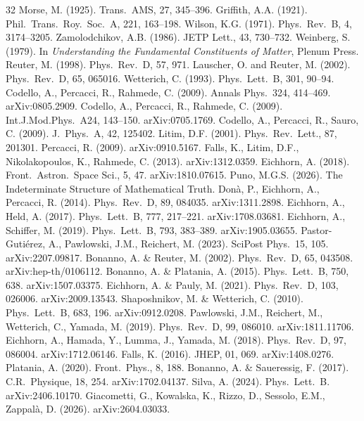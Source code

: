 \documentclass[12pt]{article}
\begin{document}
\begin{thebibliography}{32}
 Morse, M. (1925). Trans.\ AMS, 27, 345--396.
 Griffith, A.A. (1921). Phil.\ Trans.\ Roy.\ Soc.\ A, 221, 163--198.
 Wilson, K.G. (1971). Phys.\ Rev.\ B, 4, 3174--3205.
 Zamolodchikov, A.B. (1986). JETP Lett., 43, 730--732.
 Weinberg, S. (1979). In \emph{Understanding the Fundamental Constituents of Matter}, Plenum Press.
 Reuter, M. (1998). Phys.\ Rev.\ D, 57, 971.
 Lauscher, O. and Reuter, M. (2002). Phys.\ Rev.\ D, 65, 065016.
 Wetterich, C. (1993). Phys.\ Lett.\ B, 301, 90--94.
 Codello, A., Percacci, R., Rahmede, C. (2009). Annals Phys.\ 324, 414--469. arXiv:0805.2909.
 Codello, A., Percacci, R., Rahmede, C. (2009). Int.J.Mod.Phys.\ A24, 143--150. arXiv:0705.1769.
 Codello, A., Percacci, R., Sauro, C. (2009). J.\ Phys.\ A, 42, 125402.
 Litim, D.F. (2001). Phys.\ Rev.\ Lett., 87, 201301.
 Percacci, R. (2009). arXiv:0910.5167.
 Falls, K., Litim, D.F., Nikolakopoulos, K., Rahmede, C. (2013). arXiv:1312.0359.
 Eichhorn, A. (2018). Front.\ Astron.\ Space Sci., 5, 47. arXiv:1810.07615.
 Puno, M.G.S. (2026). The Indeterminate Structure of Mathematical Truth.
 Don\`{a}, P., Eichhorn, A., Percacci, R. (2014). Phys.\ Rev.\ D, 89, 084035. arXiv:1311.2898.
 Eichhorn, A., Held, A. (2017). Phys.\ Lett.\ B, 777, 217--221. arXiv:1708.03681.
 Eichhorn, A., Schiffer, M. (2019). Phys.\ Lett.\ B, 793, 383--389. arXiv:1905.03655.
 Pastor-Guti\'{e}rez, A., Pawlowski, J.M., Reichert, M. (2023). SciPost Phys.\ 15, 105. arXiv:2207.09817.
 Bonanno, A. \& Reuter, M. (2002). Phys.\ Rev.\ D, 65, 043508. arXiv:hep-th/0106112.
 Bonanno, A. \& Platania, A. (2015). Phys.\ Lett.\ B, 750, 638. arXiv:1507.03375.
 Eichhorn, A. \& Pauly, M. (2021). Phys.\ Rev.\ D, 103, 026006. arXiv:2009.13543.
 Shaposhnikov, M. \& Wetterich, C. (2010). Phys.\ Lett.\ B, 683, 196. arXiv:0912.0208.
 Pawlowski, J.M., Reichert, M., Wetterich, C., Yamada, M. (2019). Phys.\ Rev.\ D, 99, 086010. arXiv:1811.11706.
 Eichhorn, A., Hamada, Y., Lumma, J., Yamada, M. (2018). Phys.\ Rev.\ D, 97, 086004. arXiv:1712.06146.
 Falls, K. (2016). JHEP, 01, 069. arXiv:1408.0276.
 Platania, A. (2020). Front.\ Phys., 8, 188.
 Bonanno, A. \& Saueressig, F. (2017). C.R.\ Physique, 18, 254. arXiv:1702.04137.
 Silva, A. (2024). Phys.\ Lett.\ B. arXiv:2406.10170.
 Giacometti, G., Kowalska, K., Rizzo, D., Sessolo, E.M., Zappal\`{a}, D. (2026). arXiv:2604.03033.
\end{thebibliography}
\end{document}
